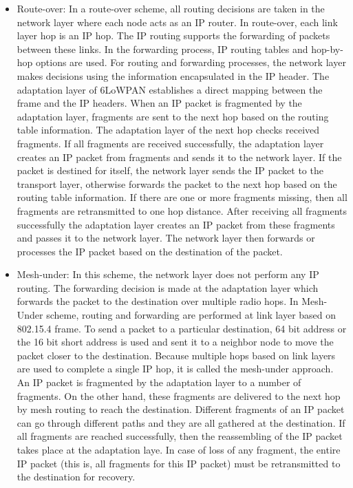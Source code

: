 \documentclass[11pt,draftclsnofoot,onecolumn]{IEEEtran}
\begin{document}
\begin{itemize}
\item Route-over: In a route-over scheme, all routing decisions are taken in the network layer where each node acts as an IP router. In route-over, each link layer hop is an IP hop. The IP routing supports the forwarding of packets between these links. In the forwarding process, IP routing tables and hop-by-hop options are used. For routing and forwarding processes, the network layer makes decisions using the information encapsulated in the IP header. The adaptation layer of 6LoWPAN establishes a direct mapping between the frame and the IP headers. When an IP packet is fragmented by the adaptation layer, fragments are sent to the next hop based on the routing table information. The adaptation layer of the next hop checks received fragments. If all fragments are received successfully, the adaptation layer creates an IP packet from fragments and sends it to the network layer. If the packet is destined for itself, the network layer sends the IP packet to the transport layer, otherwise forwards the packet to the next hop based on the routing table information. If there are one or more fragments missing, then all fragments are retransmitted to one hop distance. After receiving all fragments successfully the adaptation layer creates an IP packet from these fragments and passes it to the network layer. The network layer then forwards or processes the IP packet based on the destination of the packet.

\item Mesh-under: In this scheme, the network layer does not perform any IP routing. The forwarding decision is made at the adaptation layer which forwards the packet to the destination over multiple radio hops. In Mesh-Under scheme, routing and forwarding are performed at link layer based on 802.15.4 frame. To send a packet to a particular destination, 64 bit address or the 16 bit short address is used and sent it to a neighbor node to move the packet closer to the destination. Because multiple hops based on link layers are used to complete a single IP hop, it is called the mesh-under approach. An IP packet is fragmented by the adaptation layer to a number of fragments. On the other hand, these fragments are delivered to the next hop by mesh routing to reach the destination. Different fragments of an IP packet can go through different paths and they are all gathered at the destination. If all fragments are reached successfully, then the reassembling of the IP packet takes place at the adaptation laye. In case of loss of any fragment, the entire IP packet (this is, all fragments for this IP packet) must be retransmitted to the destination for recovery.
\end{itemize}
\end{document}
